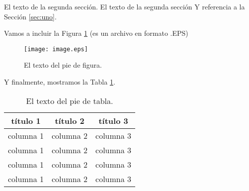 \documentclass{llncs}
\begin{document}
El texto de la segunda sección. El texto de la segunda sección Y referencia a la Sección \ref{sec:uno}.

Vamos a incluir la Figura \ref{fig:image} (es un archivo en formato .EPS)

\begin{figure}
\begin{center}
\texttt{[image: image.eps]} \\
\caption{\small{El texto del pie de figura.}}
\label{fig:image}
\end{center}
\end{figure}

Y finalmente, mostramos la Tabla \ref{table:tabla}.

\begin{table}
\begin{center}
\begin{tabular}{|c|c|c|}
\hline 
título 1 & título 2 & título 3  \\
\hline
\hline
columna 1 & columna 2 & columna 3  \\
\hline
columna 1 & columna 2 & columna 3  \\
\hline
columna 1 & columna 2 & columna 3  \\
\hline
columna 1 & columna 2 & columna 3  \\
\hline
\end{tabular}
\end{center}
\caption{\small{El texto del pie de tabla.}}
\label{table:tabla}
\end{table}




\end{document}
